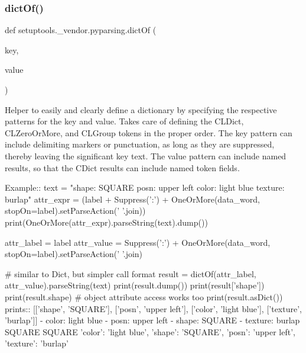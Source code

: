 \subsubsection{\texorpdfstring{dict\+Of()}{dictOf()}}
{\footnotesize\ttfamily def setuptools.\+\_\+vendor.\+pyparsing.\+dict\+Of (\begin{DoxyParamCaption}\item[{}]{key,  }\item[{}]{value }\end{DoxyParamCaption})}

\begin{DoxyVerb}Helper to easily and clearly define a dictionary by specifying the respective patterns
for the key and value.  Takes care of defining the C{L{Dict}}, C{L{ZeroOrMore}}, and C{L{Group}} tokens
in the proper order.  The key pattern can include delimiting markers or punctuation,
as long as they are suppressed, thereby leaving the significant key text.  The value
pattern can include named results, so that the C{Dict} results can include named token
fields.

Example::
    text = "shape: SQUARE posn: upper left color: light blue texture: burlap"
    attr_expr = (label + Suppress(':') + OneOrMore(data_word, stopOn=label).setParseAction(' '.join))
    print(OneOrMore(attr_expr).parseString(text).dump())
    
    attr_label = label
    attr_value = Suppress(':') + OneOrMore(data_word, stopOn=label).setParseAction(' '.join)

    # similar to Dict, but simpler call format
    result = dictOf(attr_label, attr_value).parseString(text)
    print(result.dump())
    print(result['shape'])
    print(result.shape)  # object attribute access works too
    print(result.asDict())
prints::
    [['shape', 'SQUARE'], ['posn', 'upper left'], ['color', 'light blue'], ['texture', 'burlap']]
    - color: light blue
    - posn: upper left
    - shape: SQUARE
    - texture: burlap
    SQUARE
    SQUARE
    {'color': 'light blue', 'shape': 'SQUARE', 'posn': 'upper left', 'texture': 'burlap'}
\end{DoxyVerb}
 \mbox{\label{namespacesetuptools_1_1__vendor_1_1pyparsing_a92f7fc6321bbaa184284962d93d83c3b}} 
